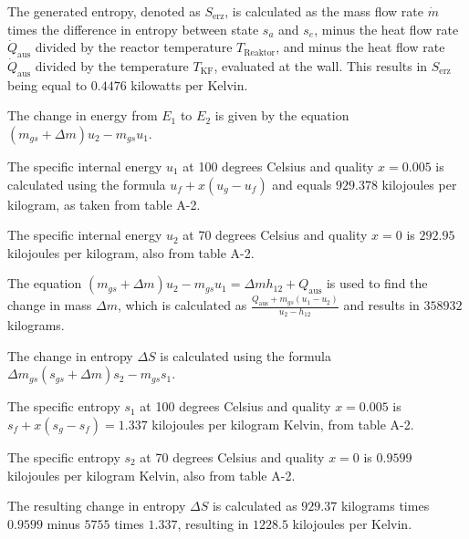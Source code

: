 The generated entropy, denoted as \( S_{\text{erz}} \), is calculated as the mass flow rate \( \dot{m} \) times the difference in entropy between state \( s_a \) and \( s_e \), minus the heat flow rate \( \dot{Q}_{\text{aus}} \) divided by the reactor temperature \( T_{\text{Reaktor}} \), and minus the heat flow rate \( \dot{Q}_{\text{aus}} \) divided by the temperature \( T_{\text{KF}} \), evaluated at the wall. This results in \( S_{\text{erz}} \) being equal to \( 0.4476 \) kilowatts per Kelvin.

The change in energy from \( E_1 \) to \( E_2 \) is given by the equation \( (m_{gs} + \Delta m) u_2 - m_{gs} u_1 \).

The specific internal energy \( u_1 \) at 100 degrees Celsius and quality \( x = 0.005 \) is calculated using the formula \( u_f + x (u_g - u_f) \) and equals \( 929.378 \) kilojoules per kilogram, as taken from table A-2.

The specific internal energy \( u_2 \) at 70 degrees Celsius and quality \( x = 0 \) is \( 292.95 \) kilojoules per kilogram, also from table A-2.

The equation \( (m_{gs} + \Delta m) u_2 - m_{gs} u_1 = \Delta m h_{12} + Q_{\text{aus}} \) is used to find the change in mass \( \Delta m \), which is calculated as \( \frac{Q_{\text{aus}} + m_{gs} (u_1 - u_2)}{u_2 - h_{12}} \) and results in \( 358932 \) kilograms.

The change in entropy \( \Delta S \) is calculated using the formula \( \Delta m_{gs} (s_{gs} + \Delta m) s_2 - m_{gs} s_1 \).

The specific entropy \( s_1 \) at 100 degrees Celsius and quality \( x = 0.005 \) is \( s_f + x (s_g - s_f) = 1.337 \) kilojoules per kilogram Kelvin, from table A-2.

The specific entropy \( s_2 \) at 70 degrees Celsius and quality \( x = 0 \) is \( 0.9599 \) kilojoules per kilogram Kelvin, also from table A-2.

The resulting change in entropy \( \Delta S \) is calculated as \( 929.37 \) kilograms times \( 0.9599 \) minus \( 5755 \) times \( 1.337 \), resulting in \( 1228.5 \) kilojoules per Kelvin.